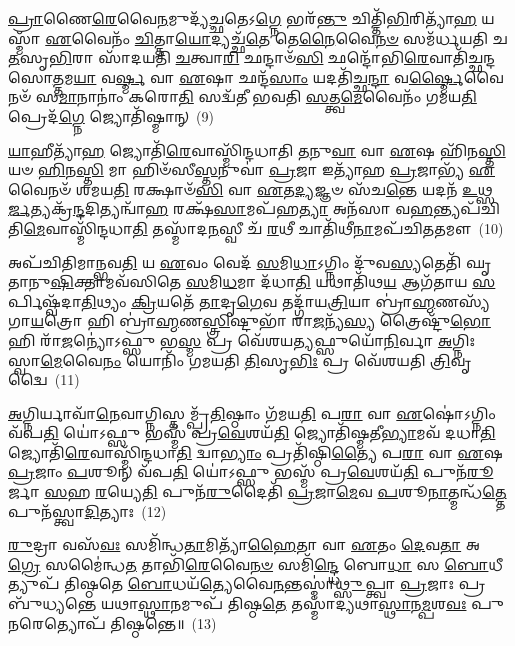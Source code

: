 \-\ul{𑌪𑍍𑌰𑌾}\-𑌣𑍈\-\ul{𑌰𑍇}\-𑌵𑍈\-\ul{𑌨}\-𑌮𑍁𑌦𑍍𑌯᳴\-\ul{𑌚𑍍𑌛}\-𑌤𑍇\-𑌽\-\ul{𑌗𑍍𑌨𑍇} 𑌭𑌰᳴\-\ul{𑌨𑍍𑌤𑍁} 𑌚𑌿𑌤𑍍𑌤𑌿᳴\-\ul{𑌭𑌿}\-𑌰𑌿𑌤𑍍𑌯𑌾᳴\-\ul{𑌹} 𑌯𑌸𑍍𑌮𑌾᳴ \ul{𑌏}\-𑌵𑍈𑌨𑌂᳴ \ul{𑌚𑌿}\-𑌤𑍍𑌤𑌾\-\ul{𑌯𑍋}\-𑌦𑍍𑌯𑌚𑍍𑌛᳴\-\ul{𑌤𑍇} 𑌤𑍇\-\ul{𑌨𑍈}\-𑌵𑍈\-\ul{𑌨}\-\-\ul{𑍞} 𑌸𑌮᳴𑌰𑍍𑌧𑌯𑌤𑌿 𑌚\-\ul{𑌤}\-𑌸𑍃\-\ul{𑌭𑌿}\-𑌰𑌾 𑌸𑌾᳴𑌦𑌯𑌤𑌿 \ul{𑌚}\-𑌤𑍍𑌵𑌾\-\ul{𑌰𑌿} 𑌛𑌨𑍍𑌦𑌾𑍞᳴\-\ul{𑌸𑌿} 𑌛𑌨𑍍𑌦𑍋᳴𑌭𑌿\-\ul{𑌰𑍇}\-𑌵𑌾𑌤𑌿᳴𑌚𑍍𑌛𑌨𑍍𑌦𑌸𑍋\-\ul{𑌤𑍍𑌤}\-𑌮\-\ul{𑌯𑌾} 𑌵\-\ul{𑌰𑍍𑌷𑍍𑌮} 𑌵𑌾 \ul{𑌏}\-𑌷𑌾 𑌛𑌨𑍍𑌦᳴\-\ul{𑌸𑌾𑌂} 𑌯𑌦𑌤𑌿᳴𑌚𑍍𑌛\-\ul{𑌨𑍍𑌦𑌾} 𑌵\-\ul{𑌰𑍍𑌷𑍍𑌮𑍈}\-𑌵𑍈𑌨𑍞᳴ 𑌸\-\ul{𑌮𑌾}\-𑌨𑌾𑌨𑌾𑌂॑ 𑌕𑌰𑍋\-\ul{𑌤𑌿} 𑌸𑌦𑍍𑌵᳴𑌤𑍀 𑌭𑌵𑌤𑌿 \ul{𑌸}\-𑌤𑍍𑌤𑍍𑌵\-\ul{𑌮𑍇}\-𑌵𑍈𑌨𑌂᳴ 𑌗𑌮𑌯\-\ul{𑌤𑌿} 𑌪𑍍𑌰𑍇𑌦᳴\-\ul{𑌗𑍍𑌨𑍇} 𑌜𑍍𑌯𑍋𑌤𑌿᳴𑌷𑍍𑌮𑌾𑌨𑍍~(9)

\-\ul{𑌯𑌾}\-𑌹𑍀𑌤𑍍𑌯𑌾᳴\-\ul{𑌹} 𑌜𑍍𑌯𑍋𑌤𑌿᳴\-\ul{𑌰𑍇}\-𑌵𑌾𑌸𑍍𑌮𑌿᳴𑌨𑍍𑌦𑌧𑌾𑌤𑌿 \ul{𑌤}\-𑌨𑍁\-\ul{𑌵𑌾} 𑌵𑌾 \ul{𑌏}\-𑌷 𑌹𑌿᳴𑌨\-\ul{𑌸𑍍𑌤𑌿} 𑌯𑍞 \ul{𑌹𑌿}\-𑌨\-\ul{𑌸𑍍𑌤𑌿} 𑌮𑌾 𑌹𑌿𑍞᳴𑌸𑍀\-\ul{𑌸𑍍𑌤}\-𑌨𑍁𑌵𑌾॑ \ul{𑌪𑍍𑌰}\-𑌜𑌾 𑌇𑌤𑍍𑌯𑌾᳴𑌹 \ul{𑌪𑍍𑌰}\-𑌜𑌾𑌭𑍍𑌯᳴ \ul{𑌏}\-𑌵𑍈𑌨𑍞᳴ 𑌶𑌮𑌯\-\ul{𑌤𑌿} 𑌰𑌕𑍍𑌷𑌾𑍞᳴\-\ul{𑌸𑌿} 𑌵𑌾 \ul{𑌏}\-𑌤\-\ul{𑌦𑍍𑌯}\-𑌜𑍍𑌞𑍞 𑌸᳴𑌚\-\ul{𑌨𑍍𑌤𑍇} 𑌯𑌦𑌨᳴ \ul{𑌉}\-𑌥𑍍𑌸\-\ul{𑌰𑍍𑌜}\-𑌤𑍍𑌯𑌕𑍍𑌰᳴\-\ul{𑌨𑍍𑌦}\-𑌦𑌿𑌤𑍍𑌯𑌨𑍍𑌵𑌾᳴\-\ul{𑌹} 𑌰𑌕𑍍𑌷᳴\-\ul{𑌸𑌾}\-𑌮𑌪᳴𑌹\-\ul{𑌤𑍍𑌯𑌾} 𑌅𑌨᳴𑌸𑌾 𑌵\-\ul{𑌹}\-𑌨𑍍𑌤𑍍𑌯𑌪᳴𑌚𑌿𑌤𑌿\-\ul{𑌮𑍇}\-𑌵𑌾𑌸𑍍𑌮𑌿᳴𑌨𑍍𑌦𑌧𑌾\-\ul{𑌤𑌿} 𑌤𑌸𑍍𑌮𑌾᳴𑌦\-\ul{𑌨}\-𑌸𑍍𑌵𑍀 𑌚᳴ \ul{𑌰}\-𑌥𑍀 𑌚𑌾𑌤𑌿᳴𑌥𑍀\-\ul{𑌨𑌾}\-𑌮𑌪᳴𑌚𑌿𑌤𑌤𑌮𑍗~(10)

𑌅𑌪᳴𑌚𑌿𑌤𑌿𑌮𑌾𑌨𑍍𑌭𑌵\-\ul{𑌤𑌿} 𑌯 \ul{𑌏}\-𑌵𑌂 𑌵𑍇𑌦᳴ \ul{𑌸}\-𑌮𑌿\-\ul{𑌧𑌾}\-\-𑌽𑌗𑍍𑌨𑌿𑌂 𑌦𑍁᳴𑌵\-\ul{𑌸𑍍𑌯}\-𑌤𑍇𑌤𑌿᳴ 𑌘𑍃𑌤𑌾𑌨𑍁\-\ul{𑌷𑌿}\-𑌕𑍍𑌤𑌾𑌮𑌵᳴𑌸𑌿𑌤𑍇 \ul{𑌸}\-𑌮𑌿\-\ul{𑌧}\-𑌮𑌾 𑌦᳴𑌧𑌾\-\ul{𑌤𑌿} 𑌯𑌥𑌾𑌤𑌿᳴𑌥\-\ul{𑌯} 𑌆𑌗᳴𑌤𑌾𑌯 \ul{𑌸}\-𑌰𑍍𑌪𑌿𑌷𑍍𑌵᳴𑌦𑌾\-\ul{𑌤𑌿}\-𑌥𑍍𑌯𑌂 \ul{𑌕𑍍𑌰𑌿}\-𑌯𑌤𑍇᳴ \ul{𑌤𑌾}\-𑌦𑍃\-\ul{𑌗𑍇}\-𑌵 𑌤𑌦𑍍𑌗𑌾᳴𑌯\-\ul{𑌤𑍍𑌰𑌿}\-𑌯𑌾 𑌬𑍍𑌰𑌾॑\-\ul{𑌹𑍍𑌮}\-𑌣𑌸𑍍𑌯᳴ 𑌗𑌾\-\ul{𑌯}\-𑌤𑍍𑌰𑍋 𑌹𑌿 𑌬𑍍𑌰𑌾॑\-\ul{𑌹𑍍𑌮}\-𑌣\-\ul{𑌸𑍍𑌤𑍍𑌰𑌿}\-𑌷𑍍𑌟𑍁𑌭𑌾᳴ 𑌰𑌾\-\ul{𑌜}\-𑌨𑍍𑌯᳴\-\ul{𑌸𑍍𑌯} 𑌤𑍍𑌰𑍈𑌷𑍍𑌟𑍁᳴\-\ul{𑌭𑍋} 𑌹𑌿 𑌰𑌾᳴\-\ul{𑌜}\-𑌨𑍍𑌯𑍋॑\-𑌽𑌫𑍍𑌸𑍁 𑌭\-\ul{𑌸𑍍𑌮} 𑌪𑍍𑌰 𑌵𑍇᳴𑌶𑌯\-\ul{𑌤𑍍𑌯}\-𑌫𑍍𑌸𑍁𑌯𑍋᳴\-\ul{𑌨𑌿}\-𑌰𑍍𑌵𑌾 \ul{𑌅}\-𑌗𑍍𑌨𑌿𑌃 𑌸𑍍𑌵𑌾\-\ul{𑌮𑍇}\-𑌵𑍈\-\ul{𑌨𑌂} 𑌯𑍋𑌨𑌿𑌂᳴ 𑌗𑌮𑌯𑌤𑌿 \ul{𑌤𑌿}\-𑌸𑍃\-\ul{𑌭𑌿𑌃} 𑌪𑍍𑌰 𑌵𑍇᳴𑌶𑌯𑌤𑌿 \ul{𑌤𑍍𑌰𑌿}\-𑌵𑍃𑌦𑍍𑌵𑍈~(11)

\-\ul{𑌅}\-𑌗𑍍𑌨𑌿𑌰𑍍𑌯𑌾𑌵𑌾᳴\-\ul{𑌨𑍇}\-𑌵𑌾𑌗𑍍𑌨𑌿𑌸𑍍𑌤𑌮𑍍𑌪𑍍𑌰᳴\-\ul{𑌤𑌿}\-𑌷𑍍𑌠𑌾𑌂 𑌗᳴𑌮𑌯\-\ul{𑌤𑌿} 𑌪\-\ul{𑌰𑌾} 𑌵𑌾 \ul{𑌏}\-𑌷𑍋॑\-𑌽𑌗𑍍𑌨𑌿𑌂 𑌵᳴𑌪\-\ul{𑌤𑌿} 𑌯𑍋॑\-𑌽𑌫𑍍𑌸𑍁 𑌭𑌸𑍍𑌮᳴ 𑌪𑍍𑌰\-\ul{𑌵𑍇}\-𑌶𑌯᳴\-\ul{𑌤𑌿} 𑌜𑍍𑌯𑍋𑌤𑌿᳴𑌷𑍍𑌮𑌤𑍀\-\ul{𑌭𑍍𑌯𑌾}\-𑌮𑌵᳴ 𑌦𑌧𑌾\-\ul{𑌤𑌿} 𑌜𑍍𑌯𑍋𑌤𑌿᳴\-\ul{𑌰𑍇}\-𑌵𑌾𑌸𑍍𑌮𑌿᳴𑌨𑍍𑌦𑌧𑌾\-\ul{𑌤𑌿} 𑌦𑍍𑌵𑌾\-\ul{𑌭𑍍𑌯𑌾𑌂} 𑌪𑍍𑌰𑌤𑌿᳴𑌷𑍍𑌠𑌿\-\ul{𑌤𑍍𑌯𑍈} 𑌪\-\ul{𑌰𑌾} 𑌵𑌾 \ul{𑌏}\-𑌷 \ul{𑌪𑍍𑌰}\-𑌜𑌾𑌂 \ul{𑌪}\-𑌶𑍂𑌨𑍍 𑌵᳴𑌪\-\ul{𑌤𑌿} 𑌯𑍋॑\-𑌽𑌫𑍍𑌸𑍁 𑌭𑌸𑍍𑌮᳴ 𑌪𑍍𑌰\-\ul{𑌵𑍇}\-𑌶𑌯᳴\-\ul{𑌤𑌿} 𑌪𑍁𑌨᳴\-\ul{𑌰𑍂}\-𑌰𑍍𑌜𑌾 \ul{𑌸}\-𑌹 \ul{𑌰}\-𑌯𑍍𑌯𑍇\-\ul{𑌤𑌿} 𑌪𑍁𑌨᳴\-\ul{𑌰𑍁}\-𑌦𑍈𑌤𑌿᳴ \ul{𑌪𑍍𑌰}\-𑌜𑌾\-\ul{𑌮𑍇}\-𑌵 \ul{𑌪}\-𑌶𑍂\-\ul{𑌨𑌾}\-𑌤𑍍𑌮𑌨𑍍𑌧᳴\-\ul{𑌤𑍍𑌤𑍇} 𑌪𑍁𑌨᳴𑌸𑍍𑌤𑍍𑌵𑌾\-\ul{𑌦𑌿}\-𑌤𑍍𑌯𑌾𑌃~(12)

\-\ul{𑌰𑍁}\-𑌦𑍍𑌰𑌾 𑌵𑌸᳴\-\ul{𑌵𑌃} 𑌸𑌮𑌿᳴𑌨𑍍𑌧\-\ul{𑌤𑌾}\-𑌮𑌿𑌤𑍍𑌯𑌾᳴\-\ul{𑌹𑍈}\-𑌤𑌾 𑌵𑌾 \ul{𑌏}\-𑌤𑌂 \ul{𑌦𑍇}\-𑌵\-\ul{𑌤𑌾} 𑌅\-\ul{𑌗𑍍𑌰𑍇} 𑌸𑌮𑍈॑𑌨𑍍𑌧\-\ul{𑌤} 𑌤𑌾𑌭𑌿᳴\-\ul{𑌰𑍇}\-𑌵𑍈\-\ul{𑌨}\-\-\ul{𑍞} 𑌸𑌮𑌿᳴\-\ul{𑌨𑍍𑌦𑍍𑌧𑍇} 𑌬𑍋\-\ul{𑌧𑌾} 𑌸 \ul{𑌬𑍋}\-𑌧𑍀𑌤𑍍𑌯𑍁𑌪᳴ 𑌤𑌿𑌷𑍍𑌠𑌤𑍇 \ul{𑌬𑍋}\-𑌧𑌯᳴\-\ul{𑌤𑍍𑌯𑍇}\-𑌵𑍈\-\ul{𑌨}\-𑌨𑍍𑌤𑌸𑍍𑌮𑌾॑\-\ul{𑌥𑍍𑌸𑍁}\-𑌪𑍍𑌤𑍍𑌵𑌾 \ul{𑌪𑍍𑌰}\-𑌜𑌾𑌃 𑌪𑍍𑌰 𑌬𑍁᳴𑌧𑍍𑌯𑌨𑍍𑌤𑍇 𑌯𑌥𑌾\-\ul{𑌸𑍍𑌥𑌾}\-𑌨𑌮𑍁𑌪᳴ 𑌤𑌿𑌷𑍍𑌠\-\ul{𑌤𑍇} 𑌤𑌸𑍍𑌮𑌾॑𑌦𑍍𑌯𑌥𑌾\-\ul{𑌸𑍍𑌥𑌾}\-𑌨\-\ul{𑌮𑍍𑌪}\-𑌶\-\ul{𑌵𑌃} 𑌪𑍁\-\ul{𑌨}\-𑌰𑍇𑌤𑍍𑌯𑍋𑌪᳴ 𑌤𑌿𑌷𑍍𑌠𑌨𑍍𑌤𑍇॥~(13)

